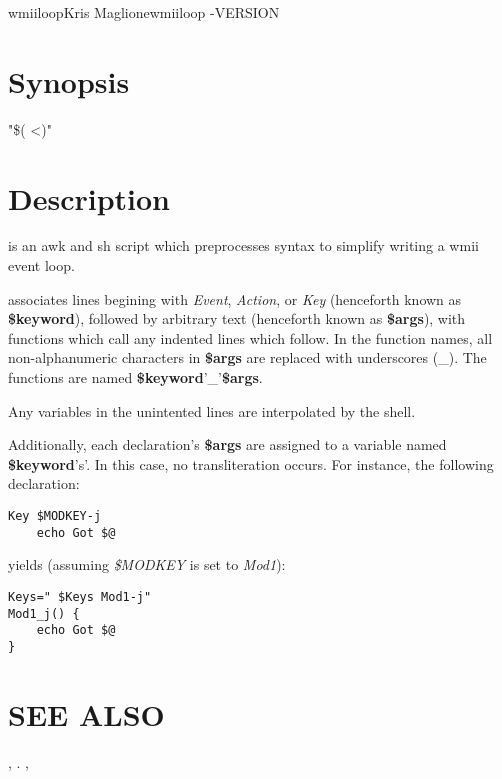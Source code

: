 \begin{Name}{1}{wmiiloop}{Kris Maglione}{}{wmiiloop}
	-VERSION
\end{Name}

\section{Synopsis}
 "\$( <)"

\section{Description}

 is an awk and sh script which preprocesses  syntax
to simplify writing a wmii event loop.

 associates lines begining with \emph{Event}, \emph{Action}, or
\emph{Key} (henceforth known as \textbf{\$keyword}), followed by arbitrary
text (henceforth known as \textbf{\$args}), with functions which call any
indented lines which follow.  In the function names, all non-alphanumeric
characters in \textbf{\$args} are replaced with underscores (\_). The
functions are named \textbf{\$keyword}'_'\textbf{\$args}.

Any variables in the unintented lines are interpolated by the shell.

Additionally, each declaration's \textbf{\$args} are assigned to a variable
named \textbf{\$keyword}'s'. In this case, no transliteration occurs. For
instance, the following declaration:

\begin{verbatim}
Key $MODKEY-j
	echo Got $@
\end{verbatim}
yields (assuming \emph{\$MODKEY} is set to \emph{Mod1}):

\begin{verbatim}
Keys=" $Keys Mod1-j"
Mod1_j() {
	echo Got $@
}
\end{verbatim}

\section{SEE ALSO}
, . ,

